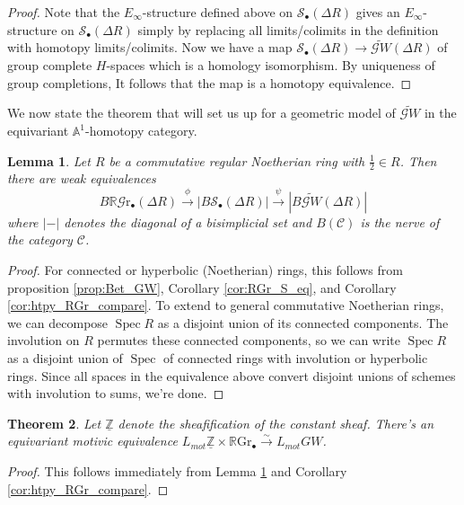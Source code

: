 \documentclass[edeposit,fullpage]{uiucthesis2009}
\newcommand{\Z}{\mathbb Z}
\newcommand{\mbb}{\mathbb}
\newcommand{\mc}{\mathcal}
\newcommand{\RGr}{\mathbb R\mathrm{Gr}}
\newcommand{\hRGr}{\mathbb R\mathscr{G}{\mathrm{r}}}
\DeclareMathOperator{\Spec}{Spec}
\theoremstyle{plain}
\newtheorem{lemma}{Lemma}
\numberwithin{lemma}{section}
\newtheorem{theorem}[lemma]{Theorem}
\theoremstyle{definition}
\begin{document}
\begin{proof}
Note that the $E_\infty$-structure defined above on $\mc
S_\bullet(\Delta R)$ gives an $E_\infty$-structure on $\mathscr
S_\bullet(\Delta R)$ simply by replacing all limits/colimits in the
definition with homotopy limits/colimits. Now we have a map $\mathscr
S_\bullet(\Delta R) \rightarrow \widetilde{\mathscr GW}(\Delta R)$ of
group complete $H$-spaces which is a homology isomorphism. By
uniqueness of group completions, It follows
that the map is a homotopy equivalence. 
\end{proof}

We now state the theorem that will set us up for a geometric model of
$\widetilde{\mathscr GW}$ in the equivariant $\mbb A^1$-homotopy
category. 

\begin{lemma}\label{lem:RGr_GW}
Let $R$ be a commutative regular Noetherian ring with
$\frac{1}{2} \in R$. Then there are weak equivalences
\[
B\hRGr_\bullet(\Delta R) \xrightarrow{\phi} |B\mathscr S_\bullet(\Delta R)| \xrightarrow{\psi}
|B\widetilde{\mathscr GW}(\Delta R)|
\]
where $| - |$ denotes the diagonal of a bisimplicial set and
$B(\mathcal C)$ is
the nerve of the category $\mathcal C$. 
\end{lemma}

\begin{proof}
For connected or hyperbolic (Noetherian) rings, this follows from
proposition \ref{prop:Bet_GW}, Corollary
\ref{cor:RGr_S_eq}, and Corollary \ref{cor:htpy_RGr_compare}. To
extend to general commutative Noetherian rings, we can decompose
$\Spec R$
as a disjoint union of its connected components. The involution on $R$
permutes these connected components, so we can write $\Spec R$ as a
disjoint union of $\Spec$ of connected rings with involution or
hyperbolic rings. Since all spaces in the equivalence above convert
disjoint unions of schemes with involution to sums, we're done. 
\end{proof}



\begin{theorem}\label{thm:RGr_GW}
Let $\underline{\Z}$ denote the sheafification of the constant sheaf. There's an equivariant motivic equivalence $L_{mot}\underline{\Z}
\times \RGr_\bullet
\xrightarrow{\sim} L_{mot}GW$.
\end{theorem}
\begin{proof}
This follows immediately from Lemma \ref{lem:RGr_GW} and  Corollary \ref{cor:htpy_RGr_compare}.
\end{proof}
\end{document}
